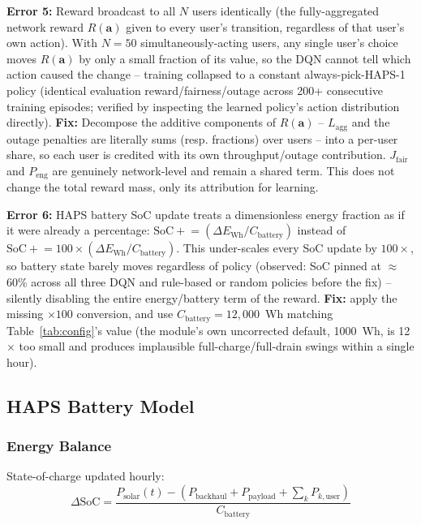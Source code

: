 \documentclass[conference]{IEEEtran}
\begin{document}
\textbf{Error 5:} Reward broadcast to all $N$ users identically (the fully-aggregated
network reward $R(\mathbf{a})$ given to every user's transition, regardless of that
user's own action). With $N=50$ simultaneously-acting users, any single user's choice
moves $R(\mathbf{a})$ by only a small fraction of its value, so the DQN cannot tell
which action caused the change -- training collapsed to a constant always-pick-HAPS-1
policy (identical evaluation reward/fairness/outage across 200+ consecutive training
episodes; verified by inspecting the learned policy's action distribution directly).
\textbf{Fix:} Decompose the additive components of $R(\mathbf{a})$ -- $L_{\text{agg}}$
and the outage penalties are literally sums (resp. fractions) over users -- into a
per-user share, so each user is credited with its own throughput/outage contribution.
$J_{\text{fair}}$ and $P_{\text{eng}}$ are genuinely network-level and remain a shared
term. This does not change the total reward mass, only its attribution for learning.

\textbf{Error 6:} HAPS battery SoC update treats a dimensionless energy fraction as if
it were already a percentage: $\text{SoC} \mathrel{+}= (\Delta E_{\text{Wh}} / C_{\text{battery}})$
instead of $\text{SoC} \mathrel{+}= 100 \times (\Delta E_{\text{Wh}} / C_{\text{battery}})$.
This under-scales every SoC update by $100\times$, so battery state barely moves
regardless of policy (observed: SoC pinned at $\approx$60\% across all three
DQN and rule-based or random policies before the fix) -- silently disabling the
entire energy/battery term of the reward. \textbf{Fix:} apply the missing $\times100$
conversion, and use $C_{\text{battery}}=12{,}000$~Wh matching Table~\ref{tab:config}'s
value (the module's own uncorrected default, 1000~Wh, is 12$\times$ too small and
produces implausible full-charge/full-drain swings within a single hour).

\subsection{HAPS Battery Model}

\subsubsection{Energy Balance}

State-of-charge updated hourly:
\begin{equation}
\Delta \text{SoC} = \frac{P_{\text{solar}}(t) - (P_{\text{backhaul}} + P_{\text{payload}} + \sum_k P_{k,\text{user}})}{C_{\text{battery}}}
\label{eq:battery-balance}
\end{equation}
\end{document}
